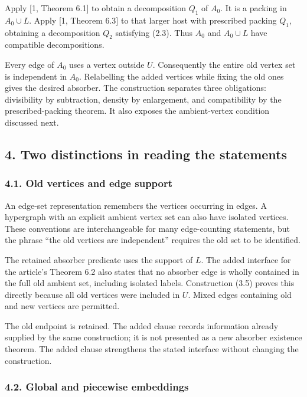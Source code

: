 \documentclass[english,11pt,a4paper]{article}
\begin{document}
Apply {[}1, Theorem 6.1{]} to obtain a decomposition \(Q_1\) of \(A_0\). It is a packing in \(A_0\cup L\). Apply {[}1, Theorem 6.3{]} to that larger host with prescribed packing \(Q_1\), obtaining a decomposition \(Q_2\) satisfying (2.3). Thus \(A_0\) and \(A_0\cup L\) have compatible decompositions.

Every edge of \(A_0\) uses a vertex outside \(U\). Consequently the entire old vertex set is independent in \(A_0\). Relabelling the added vertices while fixing the old ones gives the desired absorber. The construction separates three obligations: divisibility by subtraction, density by enlargement, and compatibility by the prescribed-packing theorem. It also exposes the ambient-vertex condition discussed next.

\subsection{4. Two distinctions in reading the statements}\label{two-distinctions-in-reading-the-statements}


\subsubsection{4.1. Old vertices and edge support}\label{old-vertices-and-edge-support}

An edge-set representation remembers the vertices occurring in edges. A hypergraph with an explicit ambient vertex set can also have isolated vertices. These conventions are interchangeable for many edge-counting statements, but the phrase ``the old vertices are independent'' requires the old set to be identified.

The retained absorber predicate uses the support of \(L\). The added interface for the article's Theorem 6.2 also states that no absorber edge is wholly contained in the full old ambient set, including isolated labels. Construction (3.5) proves this directly because all old vertices were included in \(U\). Mixed edges containing old and new vertices are permitted.

The old endpoint is retained. The added clause records information already supplied by the same construction; it is not presented as a new absorber existence theorem. The added clause strengthens the stated interface without changing the construction.


\subsubsection{4.2. Global and piecewise embeddings}\label{global-and-piecewise-embeddings}
\end{document}
